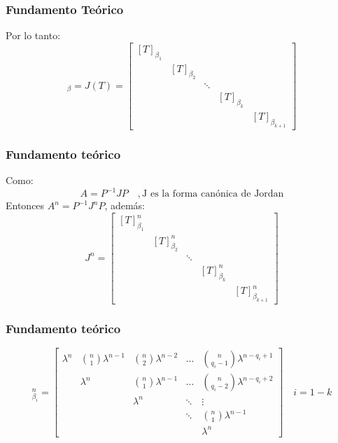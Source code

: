 \documentclass[utf8,spanish,xcolor={svgnames},12pt,handout]{beamer}
\begin{document}
\begin{frame}
\frametitle{Fundamento Teórico}
Por lo tanto:
\begin{equation*}
[T]_{\beta} = J(T) = 
\begin{bmatrix}
[T]_{\beta_{1}}	&					&			&					&	\\
				&	[T]_{\beta_{2}} &			&					&	\\
				&					&	\ddots	&					&	\\
				&					&			&	[T]_{\beta_{k}} & 	\\
				&					&			&					&[T]_{\beta_{k+1}}
\end{bmatrix}
\end{equation*}
\end{frame}



\begin{frame}
\frametitle{Fundamento teórico}
Como:
$$A = P^{-1}JP\quad, \text{J es la forma canónica de Jordan}$$
Entonces $A^{n} = P^{-1}J^{n}P$, además:
\begin{equation*}
J^{n} = \begin{bmatrix}
[T]_{\beta_{1}}^{n}	&					&			&					&	\\
				&	[T]_{\beta_{2}}^{n} &			&					&	\\
				&					&	\ddots	&					&	\\
				&					&			&	[T]_{\beta_{k}}^{n} & 	\\
				&					&			&					&[T]_{\beta_{k+1}}^{n}
\end{bmatrix}
\end{equation*}
\end{frame}


\begin{frame}
\frametitle{Fundamento teórico}

\begin{equation*}
[T]_{\beta_{i}}^{n} = 
\begin{bmatrix}
	\lambda^{n} 	& {n \choose 1}\lambda^{n-1}   	& {n \choose 2}\lambda^{n-2} 	& 	\ldots      & {n \choose q_{i}-1}\lambda^{n-q_{i}+1}\\
					& \lambda^{n}                	&  {n \choose 1}\lambda^{n-1} 	& \dots       	& {n \choose q_{i}-2}\lambda^{n-q_{i}+2}\\
					&                            	&  \lambda^{n}                	& \ddots     	&  \vdots\\                  
					&                            	&                             	& \ddots     	& {n \choose 1}\lambda^{n-1}\\                  
					&                            	&                             	&             	& \lambda^{n}
\end{bmatrix}\quad i=1-k
\end{equation*}
\end{frame}
\end{document}
